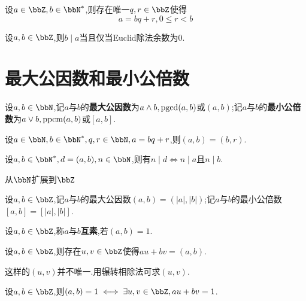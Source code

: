 \begin{thm}[Euclide除法]
    设$a \in \bbZ, b \in \bbN^*$,则存在唯一$q, r \in \bbZ$使得\[ a = bq + r, 0 \leqslant r < b \]
\end{thm}

\begin{prop}
    设$a, b \in \bbZ$,则$b \mid a$当且仅当Euclid除法余数为0.
\end{prop}

\section{最大公因数和最小公倍数}

\begin{deff}
    设$a, b \in \bbN$,记$a$与$b$的\textbf{最大公因数}为$a \land b, \operatorname{pgcd}(a, b)$或$(a, b)$;记$a$与$b$的\textbf{最小公倍数}为$a \lor b, \operatorname{ppcm}(a, b)$或$[a, b]$.
\end{deff}

\begin{lem}
    设$a \in \bbN, b \in \bbN^*, q, r \in \bbN, a = bq + r$,则$(a, b) = (b, r)$.
\end{lem}

\begin{thm}
    设$a, b \in \bbN^*, d = (a, b), n \in \bbN$,则有$n \mid d \iff n \mid a \text{且} n \mid b$.
\end{thm}

从$\bbN$扩展到$\bbZ$
\begin{deff}
    设$a, b \in \bbZ$,记$a$与$b$的最大公因数$(a, b) = (\left\lvert a \right\rvert, \left\lvert b \right\rvert)$;记$a$与$b$的最小公倍数$[a, b] = [\left\lvert a \right\rvert, \left\lvert b \right\rvert]$.
\end{deff}

\begin{deff}
    设$a, b \in \bbZ$,称$a$与$b$\textbf{互素},若$(a, b) = 1$.
\end{deff}

\begin{thm}[Bézout]
    设$a, b \in \bbZ$,则存在$u, v \in \bbZ$使得$au + bv = (a, b)$.
\end{thm}

\begin{rqq}
    这样的$(u, v)$并不唯一.用辗转相除法可求$(u, v)$.
\end{rqq}

\begin{thm}
    设$a, b \in \bbZ$,则$(a, b) = 1 \iff \exists u, v \in \bbZ, au + bv = 1$.
\end{thm}


